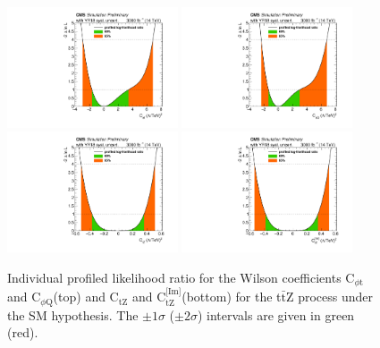 \documentclass[letterpaper,11pt]{article}
\def\ttZ{t$\bar{\text{t}}$Z\xspace}
\def\ctZ{C$_\text{tZ}$\xspace}
\def\ctZI{C$_\text{tZ}^\text{[Im]}$\xspace}
\def\cpt{C$_{\phi \text{t}}$\xspace}
\def\cpQM{C$_{\phi \text{Q}}$\xspace}
\begin{document}
\begin{figure}[tbp]
  \centering
    \includegraphics[trim={0.4cm 0.2cm 0.8cm 0.cm},clip,width=0.45\textwidth]{Figures/cpt_lumi3000_14TeV_CMScombine_r1_fullUnc.pdf}
    \includegraphics[trim={0.4cm 0.2cm 0.8cm 0.cm},clip,width=0.45\textwidth]{Figures/cpQM_lumi3000_14TeV_CMScombine_r1_fullUnc.pdf}
    \includegraphics[trim={0.4cm 0.2cm 0.8cm 0.cm},clip,width=0.45\textwidth]{Figures/ctZ_lumi3000_14TeV_CMScombine_r1_fullUnc.pdf}
    \includegraphics[trim={0.4cm 0.2cm 0.8cm 0.cm},clip,width=0.45\textwidth]{Figures/ctZI_lumi3000_14TeV_CMScombine_r1_fullUnc.pdf}
  \caption{Individual profiled likelihood ratio for the Wilson coefficients \cpt and \cpQM (top) and \ctZ and \ctZI (bottom) for the \ttZ process under the SM hypothesis.
           The $\pm 1\sigma$ ($\pm 2\sigma$) intervals are given in green (red).
           }
  \label{fig:ttZ_1Dprofnll}
\end{figure}
\end{document}
